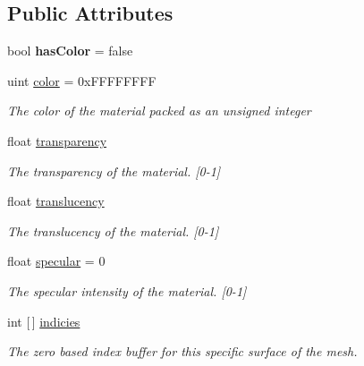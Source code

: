 \subsection*{Public Attributes}
\begin{DoxyCompactItemize}
\item 
\mbox{\label{class_b_x_d_a_mesh_1_1_b_x_d_a_surface_a5de55543d0a71780d35241d685a87512}} 
bool {\bfseries has\+Color} = false
\item 
uint \hyperlink{class_b_x_d_a_mesh_1_1_b_x_d_a_surface_ae7b70c2da6c489de054138dfa083e98a}{color} = 0x\+F\+F\+F\+F\+F\+F\+FF
\begin{DoxyCompactList}\small\item\em The color of the material packed as an unsigned integer \end{DoxyCompactList}\item 
float \hyperlink{class_b_x_d_a_mesh_1_1_b_x_d_a_surface_ae3e709bd450bd2ef01c5acba177a617b}{transparency}
\begin{DoxyCompactList}\small\item\em The transparency of the material. \mbox{[}0-\/1\mbox{]} \end{DoxyCompactList}\item 
float \hyperlink{class_b_x_d_a_mesh_1_1_b_x_d_a_surface_af19291640f35adcf6f9b6097184d1156}{translucency}
\begin{DoxyCompactList}\small\item\em The translucency of the material. \mbox{[}0-\/1\mbox{]} \end{DoxyCompactList}\item 
float \hyperlink{class_b_x_d_a_mesh_1_1_b_x_d_a_surface_af72ca2963061dfe7004b73c9ad80a6ab}{specular} = 0
\begin{DoxyCompactList}\small\item\em The specular intensity of the material. \mbox{[}0-\/1\mbox{]} \end{DoxyCompactList}\item 
int \mbox{[}$\,$\mbox{]} \hyperlink{class_b_x_d_a_mesh_1_1_b_x_d_a_surface_a72348b4bb5ec3ee8927cc8ba93c6bd6e}{indicies}
\begin{DoxyCompactList}\small\item\em The zero based index buffer for this specific surface of the mesh. \end{DoxyCompactList}\end{DoxyCompactItemize}


